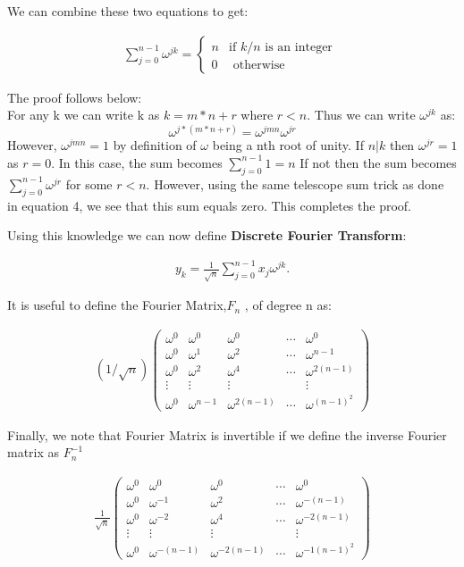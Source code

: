 \documentclass[DIV=calc, paper=a4, fontsize=11pt, twocolumn]{scrartcl}   %
\begin{document}
We can combine these two equations to get:


\begin{align}
\sum_{j=0}^{n-1}\omega^{jk} = \left\{
   \begin{array}{ll}
      n  & \mbox{if } k/n \mbox{ is an integer }\\
      0 & \mbox{ otherwise }
   \end{array}
\right.
\end{align}

The proof follows below: \\

For any k we can write k as $k = m*n +r $ where $r < n$. Thus we can write $\omega^{jk}$ as: $$\omega^{j*(m*n+r)} = \omega^{jmn}\omega^{jr} $$ However, $\omega^{jmn}=1$ by definition of $\omega$ being a nth root of unity. If $n|k$ then $\omega^{jr} = 1$ as $r=0$. In this case, the sum becomes $\sum_{j=0}^{n-1}1=n$ If not then the sum becomes $\sum_{j=0}^{n-1}\omega^{jr}$ for some $r<n$. However, using the same telescope sum trick as done in equation 4, we see that this sum equals zero. This completes the proof.

\par Using this knowledge we can now define \textbf{Discrete Fourier Transform}:

\begin{align}
y_k = \frac{1}{\sqrt{n}}\sum_{j=0}^{n-1}x_j\omega^{jk}.
\end{align}

It is useful to define the Fourier Matrix,$F_{n}$ , of degree n as:

\begin{align}
 (1/\sqrt n)
 \begin{pmatrix}
  \omega^0 & \omega^0 & \omega^0 & \cdots & \omega^0 \\
  \omega^0  & \omega^1 & \omega^2 &  \cdots &  \omega^{n-1} \\
   \omega^0  & \omega^2 & \omega^4 &  \cdots &  \omega^{2(n-1)} \\
  \vdots  & \vdots  & \vdots &   & \vdots  \\
  \omega^0  & \omega^{n-1} & \omega^{2(n-1)} & \cdots & \omega^{{(n-1)}^2}
 \end{pmatrix}
\end{align}

Finally, we note that Fourier Matrix is invertible if we define the inverse Fourier matrix as $F_{n}^{-1}$

\begin{align}
\frac{1}{\sqrt n}
 \begin{pmatrix}
  \omega^0 & \omega^0 & \omega^0 & \cdots & \omega^0 \\
  \omega^0  & \omega^{-1} & \omega^2 &  \cdots &  \omega^{-(n-1)} \\
   \omega^0  & \omega^{-2} & \omega^4 &  \cdots &  \omega^{-2(n-1)} \\
  \vdots  & \vdots  & \vdots &   & \vdots  \\
  \omega^0  & \omega^{-(n-1)} & \omega^{-2(n-1)} & \cdots & \omega^{{-1(n-1)}^2}
 \end{pmatrix}
\end{align}
\end{document}
